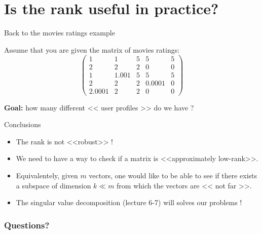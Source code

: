 \documentclass{beamer}
\begin{document}
\section{Is the rank useful in practice?}

\begin{frame}[t]{Back to the movies ratings example}
	\grid

	\vspace{-0.3cm}
	Assume that you are given the matrix of movies ratings:
	$$
	\begin{pmatrix}
		1 & 1 & 5 & 5 & 5 \\
		2 & 2 & 2 & 0 & 0 \\
		1 & 1.001 & 5 & 5 & 5 \\
		2 & 2 & 2 & 0.0001 & 0 \\
		2.0001 & 2 & 2 & 0 & 0 
	\end{pmatrix}
	$$

	\vspace{0.5cm}
	\textbf{Goal:} how many different << user profiles >> do we have ?
\end{frame}



\begin{frame}[t]{Conclusions}
	\grid

	\begin{itemize}
		\item The rank is not <<robust>> !
			\vspace{0.3cm}
		\item We need to have a way to check if a matrix is <<approximately low-rank>>.
			\vspace{0.3cm}
		\item Equivalentely, given $m$ vectors, one would like to be able to see if there exists a subspace of dimension $k \ll m$ from which the vectors are << not far >>.
			\vspace{0.3cm}
		\item The singular value decomposition (lecture 6-7) will solves our problems !
	\end{itemize}
\end{frame}


\appendix
\backupbegin
\begin{frame}[t]
	\frametitle{Questions?}
	\grid

	\pause
	\pause
\end{frame}
\backupend
\end{document}

